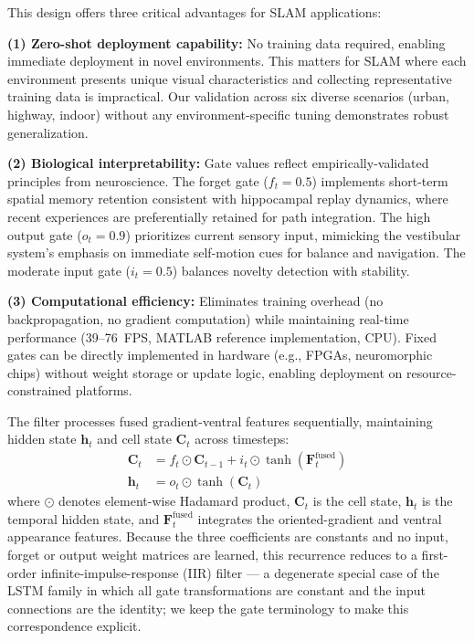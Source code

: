 This design offers three critical advantages for SLAM applications:

\textbf{(1) Zero-shot deployment capability:} No training data required, enabling immediate deployment in novel environments. This matters for SLAM where each environment presents unique visual characteristics and collecting representative training data is impractical. Our validation across six diverse scenarios (urban, highway, indoor) without any environment-specific tuning demonstrates robust generalization.

\textbf{(2) Biological interpretability:} Gate values reflect em\-pir\-i\-cal\-ly-val\-i\-dat\-ed principles from neuroscience. The forget gate ($f_t=0.5$) implements short-term spatial memory retention consistent with hippocampal replay dynamics, where recent experiences are preferentially retained for path integration. The high output gate ($o_t=0.9$) prioritizes current sensory input, mimicking the ves\-tib\-u\-lar system's emphasis on immediate self-motion cues for balance and navigation. The moderate input gate ($i_t=0.5$) balances novelty detection with stability.

\textbf{(3) Computational efficiency:} Eliminates training overhead (no backpropagation, no gradient computation) while maintaining real-time per\-for\-mance (39--76~FPS, MATLAB reference implementation, CPU). Fixed gates can be directly implemented in hardware (e.g., FPGAs, neuromorphic chips) without weight storage or update logic, enabling deployment on resource-constrained platforms.

The filter processes fused gradient-ventral features sequentially, maintaining hidden state $\mathbf{h}_t$ and cell state $\mathbf{C}_t$ across timesteps:
\begin{align}
    \mathbf{C}_t & = f_t \odot \mathbf{C}_{t-1} + i_t \odot \tanh(\mathbf{F}^{\text{fused}}_t) \\
    \mathbf{h}_t & = o_t \odot \tanh(\mathbf{C}_t)
\end{align}
where $\odot$ denotes element-wise Hadamard product, $\mathbf{C}_t$ is the cell state, $\mathbf{h}_t$ is the temporal hidden state, and $\mathbf{F}^{\text{fused}}_t$ integrates the oriented-gradient and ventral appearance features. Because the three coefficients are constants and no input, forget or output weight matrices are learned, this recurrence reduces to a first-order infinite-impulse-response (IIR) filter --- a degenerate special case of the LSTM family in which all gate transformations are constant and the input connections are the identity; we keep the gate terminology to make this correspondence explicit.


